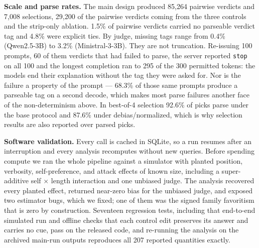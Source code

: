 \documentclass[conference]{IEEEtran}
\begin{document}
\textbf{Scale and parse rates.} The main design produced 85{,}264 pairwise verdicts and 7{,}008 selections, 29{,}200 of the pairwise verdicts coming from the three controls and the strip-only ablation. 1.5\% of pairwise verdicts carried no parseable verdict tag and 4.8\% were explicit ties. By judge, missing tags range from 0.4\% (Qwen2.5-3B) to 3.2\% (Ministral-3-3B). They are not truncation. Re-issuing 100 prompts, 60 of them verdicts that had failed to parse, the server reported \texttt{stop} on all 100 and the longest completion ran to 295 of the 300 permitted tokens: the models end their explanation without the tag they were asked for. Nor is the failure a property of the prompt --- 68.3\% of those same prompts produce a parseable tag on a second decode, which makes most parse failures another face of the non-determinism above. In best-of-4 selection 92.6\% of picks parse under the base protocol and 87.6\% under debias/normalized, which is why selection results are also reported over parsed picks.

\textbf{Software validation.} Every call is cached in SQLite, so a run resumes after an interruption and every analysis recomputes without new queries. Before spending compute we ran the whole pipeline against a simulator with planted position, verbosity, self-preference, and attack effects of known size, including a super-additive self $\times$ length interaction and one unbiased judge. The analysis recovered every planted effect, returned near-zero bias for the unbiased judge, and exposed two estimator bugs, which we fixed; one of them was the signed family favoritism that is zero by construction. Seventeen regression tests, including that end-to-end simulated run and offline checks that each control edit preserves its answer and carries no cue, pass on the released code, and re-running the analysis on the archived main-run outputs reproduces all 207 reported quantities exactly.
\end{document}
